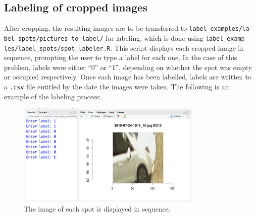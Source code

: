 \documentclass[a4paper, 11pt]{article} %
\begin{document}
	\subsection{Labeling of cropped images}
		After cropping, the resulting images are to be transferred to
		\texttt{label\_examples/la-} \texttt{bel\_spots/pictures\_to\_label/} 
		for labeling, 
		which is done using 
		\texttt{label\_examp-} \texttt{les/label\_spots/spot\_labeler.R}. This 
		script displays
		each cropped image in sequence, prompting the user to type a label for each
		one. In the case of this problem, labels were either ``0'' or ``1'',
		depending on whether the spot was empty or occupied respectively. Once each
		image has been labelled, labels are written to a \texttt{.csv} file
		entitled by the date the images were taken. The following is an example of
		the labeling process:\\
		\begin{figure}[H]
			\centering
			\includegraphics[width=0.8\textwidth]{figures/spot_labeler_example}
			\caption{The image of each spot is displayed in sequence.}
		\end{figure}	
\end{document}
